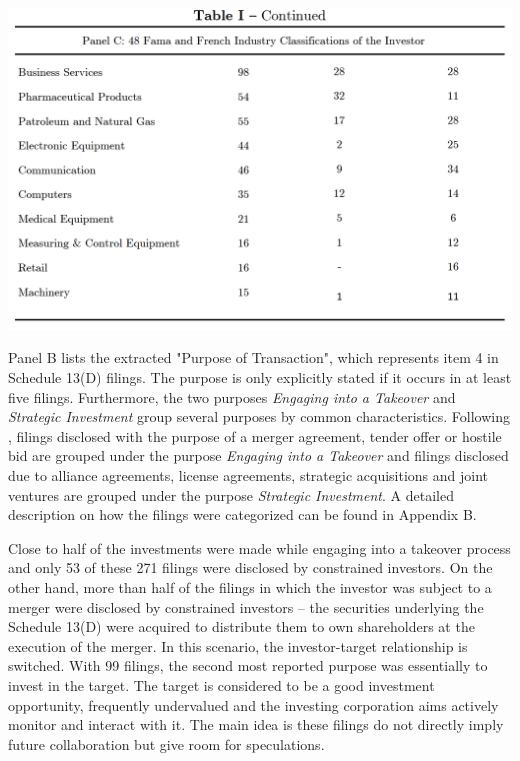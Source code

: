 \documentclass[12pt]{article}
\begin{document}
\begin{table}[!htbp]
	\centering
	\begin{adjustbox}{width=\textwidth}
		\includegraphics{descriptive2final}
	\end{adjustbox}
\end{table}
Panel B lists the extracted "Purpose of Transaction", which represents item 4 in Schedule 13(D) filings. The purpose is only explicitly stated if it occurs in at least five filings. Furthermore, the two purposes \emph{Engaging into a Takeover} and \emph{Strategic Investment} group several purposes by common characteristics. Following \citet[p.1]{Betton2008}, filings disclosed with the purpose of a merger agreement, tender offer or hostile bid are grouped under the purpose \emph{Engaging into a Takeover} and filings disclosed due to alliance agreements, license agreements, strategic acquisitions and joint ventures are grouped under the purpose \emph{Strategic Investment}. A detailed description on how the filings were categorized can be found in Appendix B.\par
Close to half of the investments were made while engaging into a takeover process and only 53 of these 271 filings were disclosed by constrained investors. On the other hand, more than half of the filings in which the investor was subject to a merger were disclosed by constrained investors -- the securities underlying the Schedule 13(D) were acquired to distribute them to own shareholders at the execution of the merger. In this scenario, the investor-target relationship is switched.
With 99 filings, the second most reported purpose was essentially to invest in the target. The target is considered to be a good investment opportunity, frequently undervalued and the investing corporation aims actively monitor and interact with it. The main idea is these filings do not directly imply future collaboration but give room for speculations.
\end{document}
